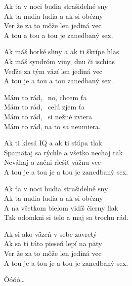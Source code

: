 
\ve{}
Ak ťa v noci budia strašidelné sny\\
Ak ťa nudia ľudia a ak si obézny\\
Ver že za to môže len jediná vec\\
A tou a tou a tou je zanedbaný sex.

\ve{}
Ak máš horké sliny a ak ti škrípe hlas\\
Ak máš syndróm viny, dnu či ischias\\
Veďže za tým väzí len jediná vec\\
A tou je a tou a tou zanedbaný sex. 

\cho{}
Mám to rád, \ no, chcem ťa\\
Mám to rád, \ celú zjem ťa\\
Mám to rád, \ si nežné zviera\\
Mám to rád, na to sa neumiera. 

\ve{}
Ak ti klesá IQ a ak ti stúpa tlak\\
Spamätaj sa rýchle a všetko nechaj tak\\
Neváhaj a začni riešiť vážnu vec\\
A tou je a tou je a tou je zanedbaný sex. 

\ve{}
Ak ťa v noci budia strašidelné sny\\
Ak ťa nudia ľudia a ak si obézny\\
A na všetkom bielom vidíš čierny flak\\
Tak odomkni si telo a maj sa trochu rád. 

\cho{}

\ve{}
Ak si ako väzeň v sebe zavretý\\
Ak sa ti táto pieseň lepí na päty\\
Ver že za to môže len jediná vec\\
A tou je a tou je a tou je zanedbaný sex.

Óóóó\ldots 

\cho{}

\esong